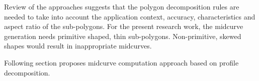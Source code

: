 
% 
% 
%

Review of the approaches suggests that the polygon decomposition rules are needed to take into account the application context, accuracy, characteristics  and aspect ratio of the sub-polygons. For the present research work, the midcurve generation needs primitive shaped, thin sub-polygons. Non-primitive, skewed shapes would result in inappropriate midcurves.

Following section proposes midcurve computation approach based on profile decomposition. %